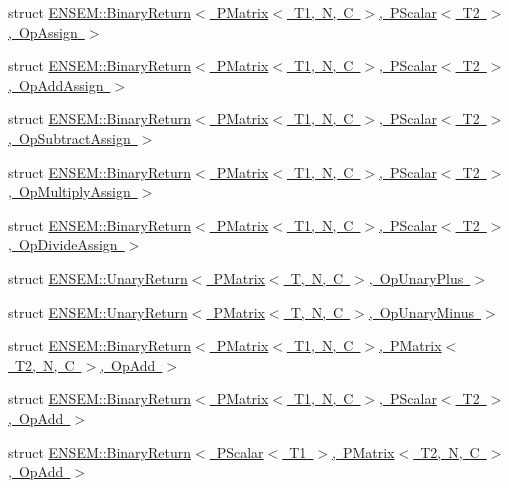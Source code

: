 \begin{DoxyCompactItemize}
\item 
struct \mbox{\hyperlink{structENSEM_1_1BinaryReturn_3_01PMatrix_3_01T1_00_01N_00_01C_01_4_00_01PScalar_3_01T2_01_4_00_01OpAssign_01_4}{E\+N\+S\+E\+M\+::\+Binary\+Return$<$ P\+Matrix$<$ T1, N, C $>$, P\+Scalar$<$ T2 $>$, Op\+Assign $>$}}
\item 
struct \mbox{\hyperlink{structENSEM_1_1BinaryReturn_3_01PMatrix_3_01T1_00_01N_00_01C_01_4_00_01PScalar_3_01T2_01_4_00_01OpAddAssign_01_4}{E\+N\+S\+E\+M\+::\+Binary\+Return$<$ P\+Matrix$<$ T1, N, C $>$, P\+Scalar$<$ T2 $>$, Op\+Add\+Assign $>$}}
\item 
struct \mbox{\hyperlink{structENSEM_1_1BinaryReturn_3_01PMatrix_3_01T1_00_01N_00_01C_01_4_00_01PScalar_3_01T2_01_4_00_01OpSubtractAssign_01_4}{E\+N\+S\+E\+M\+::\+Binary\+Return$<$ P\+Matrix$<$ T1, N, C $>$, P\+Scalar$<$ T2 $>$, Op\+Subtract\+Assign $>$}}
\item 
struct \mbox{\hyperlink{structENSEM_1_1BinaryReturn_3_01PMatrix_3_01T1_00_01N_00_01C_01_4_00_01PScalar_3_01T2_01_4_00_01OpMultiplyAssign_01_4}{E\+N\+S\+E\+M\+::\+Binary\+Return$<$ P\+Matrix$<$ T1, N, C $>$, P\+Scalar$<$ T2 $>$, Op\+Multiply\+Assign $>$}}
\item 
struct \mbox{\hyperlink{structENSEM_1_1BinaryReturn_3_01PMatrix_3_01T1_00_01N_00_01C_01_4_00_01PScalar_3_01T2_01_4_00_01OpDivideAssign_01_4}{E\+N\+S\+E\+M\+::\+Binary\+Return$<$ P\+Matrix$<$ T1, N, C $>$, P\+Scalar$<$ T2 $>$, Op\+Divide\+Assign $>$}}
\item 
struct \mbox{\hyperlink{structENSEM_1_1UnaryReturn_3_01PMatrix_3_01T_00_01N_00_01C_01_4_00_01OpUnaryPlus_01_4}{E\+N\+S\+E\+M\+::\+Unary\+Return$<$ P\+Matrix$<$ T, N, C $>$, Op\+Unary\+Plus $>$}}
\item 
struct \mbox{\hyperlink{structENSEM_1_1UnaryReturn_3_01PMatrix_3_01T_00_01N_00_01C_01_4_00_01OpUnaryMinus_01_4}{E\+N\+S\+E\+M\+::\+Unary\+Return$<$ P\+Matrix$<$ T, N, C $>$, Op\+Unary\+Minus $>$}}
\item 
struct \mbox{\hyperlink{structENSEM_1_1BinaryReturn_3_01PMatrix_3_01T1_00_01N_00_01C_01_4_00_01PMatrix_3_01T2_00_01N_00_01C_01_4_00_01OpAdd_01_4}{E\+N\+S\+E\+M\+::\+Binary\+Return$<$ P\+Matrix$<$ T1, N, C $>$, P\+Matrix$<$ T2, N, C $>$, Op\+Add $>$}}
\item 
struct \mbox{\hyperlink{structENSEM_1_1BinaryReturn_3_01PMatrix_3_01T1_00_01N_00_01C_01_4_00_01PScalar_3_01T2_01_4_00_01OpAdd_01_4}{E\+N\+S\+E\+M\+::\+Binary\+Return$<$ P\+Matrix$<$ T1, N, C $>$, P\+Scalar$<$ T2 $>$, Op\+Add $>$}}
\item 
struct \mbox{\hyperlink{structENSEM_1_1BinaryReturn_3_01PScalar_3_01T1_01_4_00_01PMatrix_3_01T2_00_01N_00_01C_01_4_00_01OpAdd_01_4}{E\+N\+S\+E\+M\+::\+Binary\+Return$<$ P\+Scalar$<$ T1 $>$, P\+Matrix$<$ T2, N, C $>$, Op\+Add $>$}}

\end{DoxyCompactItemize}
